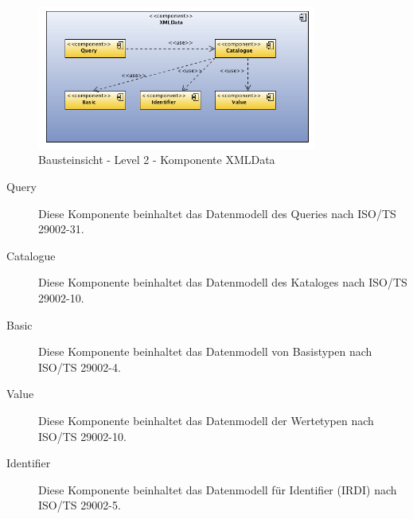 \begin{figure}[htbp]
	\centering
		\includegraphics[width=0.82\textwidth]{images/bausteinsicht_plib_level2_xmldata.png}
	\caption{Bausteinsicht - Level 2 - Komponente XMLData}
	\label{fig:bausteinsicht_level2_xmldata}
\end{figure}

\begin{description}
\item[Query] Diese Komponente beinhaltet das Datenmodell des Queries nach ISO/TS 29002-31. 
\item[Catalogue] Diese Komponente beinhaltet das Datenmodell des Kataloges nach ISO/TS 29002-10. 
\item[Basic] Diese Komponente beinhaltet das Datenmodell von Basistypen nach ISO/TS 29002-4.
\item[Value] Diese Komponente beinhaltet das Datenmodell der Wertetypen nach ISO/TS 29002-10.
\item[Identifier] Diese Komponente beinhaltet das Datenmodell für Identifier (IRDI) nach ISO/TS 29002-5. 
\end{description}

